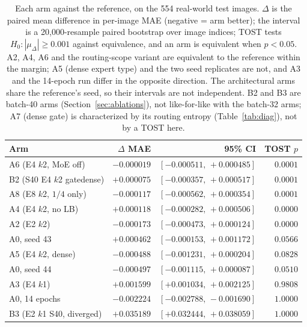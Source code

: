 \documentclass[10pt,a4paper,twocolumn,twoside]{article}
\begin{document}
\begin{table}[!t]
\centering
\caption{Each arm against the reference, on the 554 real-world test images.
$\Delta$ is the paired mean difference in per-image MAE (negative = arm better);
the interval is a 20{,}000-resample paired bootstrap over image indices; TOST
tests $H_0\!:|\mu_\Delta|\ge 0.001$ against equivalence, and an arm is
equivalent when $p<0.05$. A2, A4, A6 and the routing-scope variant are
equivalent to the reference within the margin; A5 (dense expert type) and the two
seed replicates are not, and A3 and the 14-epoch run differ in the opposite
direction. The architectural arms share the reference's seed, so their intervals are
not independent. B2 and B3 are batch-40 arms (Section~\ref{sec:ablations}), not like-for-like
with the batch-32 arms; A7 (dense gate) is characterized by its routing entropy
(Table~\ref{tab:diag}), not by a TOST here.}
\label{tab:equiv}
\small
\begin{tabular}{@{}lrrr@{}}
\toprule
Arm & $\Delta$ MAE & 95\% CI & TOST $p$ \\
\midrule
A6 (E4 $k$2, MoE off)     & $-0.000019$ & $[-0.000511,\,+0.000485]$ & $0.0001$ \\
B2 (S40 E4 $k$2 gatedense) & $+0.000075$ & $[-0.000357,\,+0.000517]$ & $0.0001$ \\
A8 (E8 $k$2, $1/4$ only)  & $-0.000117$ & $[-0.000562,\,+0.000354]$ & $0.0001$ \\
A4 (E4 $k$2, no LB)       & $+0.000118$ & $[-0.000282,\,+0.000506]$ & $0.0000$ \\
A2 (E2 $k$2)              & $-0.000173$ & $[-0.000473,\,+0.000124]$ & $0.0000$ \\
\midrule
A0, seed 43              & $+0.000462$ & $[-0.000153,\,+0.001172]$ & $0.0566$ \\
A5 (E4 $k$2, dense)       & $-0.000488$ & $[-0.001231,\,+0.000204]$ & $0.0828$ \\
A0, seed 44              & $-0.000497$ & $[-0.001115,\,+0.000087]$ & $0.0510$ \\
\midrule
A3 (E4 $k$1)              & $+0.001599$ & $[+0.001034,\,+0.002125]$ & $0.9808$ \\
A0, 14 epochs            & $-0.002224$ & $[-0.002788,\,-0.001690]$ & $1.0000$ \\
B3 (E2 $k$1 S40, diverged) & $+0.035189$ & $[+0.032444,\,+0.038059]$ & $1.0000$ \\
\bottomrule
\end{tabular}
\end{table}
\end{document}
